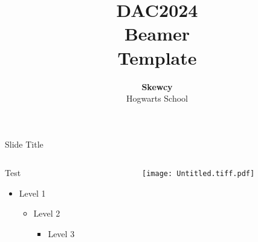 \documentclass[aspectratio=169]{beamer}
\title{DAC2024\\Beamer\\Template}
\author{\textbf{Skewcy}\\Hogwarts School}
\begin{document}
{
\begin{frame}
\end{frame}
}

{
\titlepage
}


\begin{frame}{Slide Title}
    \begin{columns}
        \begin{column}{0.5\textwidth}
            Test
            \begin{itemize}
                \item Level 1
                      \begin{itemize}
                          \item Level 2
                                \begin{itemize}
                                    \item Level 3
                                \end{itemize}
                      \end{itemize}
            \end{itemize}
        \end{column}
        \begin{column}{0.5\textwidth}
            \texttt{[image: Untitled.tiff.pdf]}
        \end{column}
    \end{columns}
\end{frame}
\end{document}
